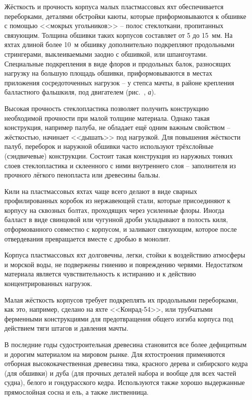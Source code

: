Жёсткость и прочность корпуса малых пластмассовых яхт обеспечивается
переборками, деталями обстройки каюты, которые приформовываются к
обшивке с помощью <<мокрых угольников>> \--- полос стеклоткани,
пропитанных связующим. Толщина обшивки таких корпусов составляет от 5
до 15~мм. На яхтах длиной более 10~м обшивку дополнительно подкрепляют
продольными стрингерами, выклеиваемыми заодно с обшивкой, или
шпангоутами. Специальные подкрепления в виде флоров и продольных
балок, разносящих нагрузку на большую площадь обшивки,
приформовываются в местах приложения сосредоточенных нагрузок \--- у
степса мачты, в районе крепления балластного фальшкиля, под двигателем
(рис.~, \textit{а}).

Высокая прочность стеклопластика позволяет получить конструкцию
необходимой прочности при малой толщине материала. Однако такая
конструкция, например палуба, не обладает ещё одним важным свойством
\--- жёсткостью, начинает <<дышать>> под нагрузкой. Для повышения
жёсткости палуб, переборок и наружной обшивки часто используют
трёхслойные (сэндвичевые) конструкции. Состоит такая конструкция из
наружных тонких слоев стеклопластика и склеенного с ними внутреннего
слоя \--- заполнителя из прочного лёгкого пенопласта или древесины
бальзы.

Кили на пластмассовых яхтах чаще всего делают в виде сварных
профилированных коробок из нержавеющей стали, которые присоединяют к
корпусу на сквозных болтах, проходящих через усиленные флоры. Иногда
балласт в виде свинцовой или чугунной дроби укладывают в полость киля,
отформованного совместно с корпусом, и заливают связующим, которое
после отвердевания превращается вместе с дробью в монолит.

Корпуса пластмассовых яхт долговечны, легки, стойки к воздействию атмосферы и морской воды, не подвержены гниению и повреждению червями. Недостатком материала является чувствительность к истиранию и к действию концентрированных нагрузок.

Малая жёсткость корпусов требует подкреплять их продольными переборками, как это, например, сделано на яхте <<Конрад-54>>, или трубчатыми ферменными конструкциями для предотвращения общего изгиба корпуса под действием тяги штагов и давления мачты.

В последние годы судостроительная древесина становится все более дефицитным и дорогим материалом на мировом рынке. Для яхтостроения применяются отборная высококачественная древесина тика, красного дерева и сибирского кедра (для обшивки) и дуба (для прочных деталей набора и вообще для всех частей судна), белого и гондурасского кедра. Используются также хорошо выдержанные прямослойная сосна и ель, а также лиственница.

